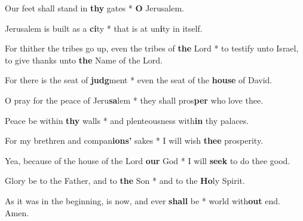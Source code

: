 \begin{multicols}{2}
	Our feet shall stand in \textbf{thy} gates * \textbf{O} Jerusalem.
	
	Jerusalem is built as a \textbf{ci}ty * that is at un\textbf{i}ty in itself.
	
	For thither the tribes go up, even the tribes of \textbf{the} Lord * to testify unto Israel, to give thanks unto \textbf{the} Name of the Lord.
	
	For there is the seat of \textbf{judg}ment * even the seat of the \textbf{house} of David.
	
	O pray for the peace of Jeru\textbf{sa}lem * they shall pros\textbf{per} who love thee.
	
	Peace be within \textbf{thy} walls * and plenteousness with\textbf{in} thy palaces.
	
	For my brethren and compan\textbf{ions'} sakes * I will wish \textbf{thee} prosperity.
	
	Yea, because of the house of the Lord \textbf{our} God * I will \textbf{seek} to do thee good.
	
	Glory be to the Father, and to \textbf{the} Son * and to the \textbf{Ho}ly Spirit.
	
	As it was in the beginning, is now, and ever \textbf{shall} be * world with\textbf{out} end. Amen.
\end{multicols}